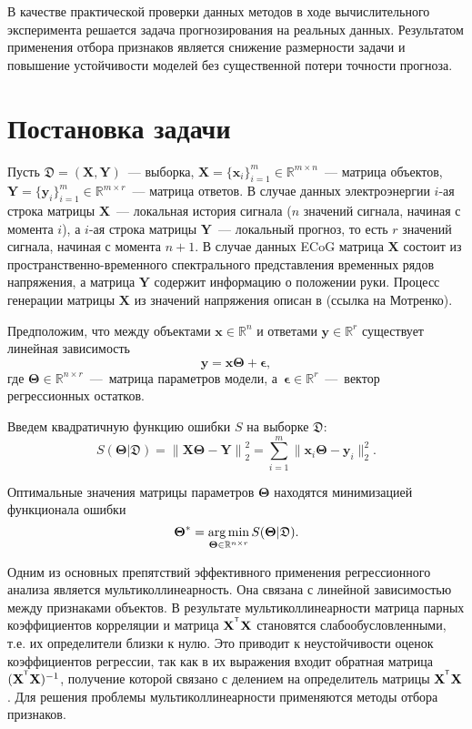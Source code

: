 \documentclass[12pt,twoside]{article}
\newcommand{\bx}{\mathbf{x}}
\newcommand{\by}{\mathbf{y}}
\newcommand{\bY}{\mathbf{Y}}
\newcommand{\bX}{\mathbf{X}}
\newcommand{\bTheta}{\boldsymbol{\Theta}}
\begin{document}
В качестве практической проверки данных методов в ходе вычислительного эксперимента решается задача прогнозирования на реальных данных.
Результатом применения отбора признаков является снижение размерности задачи и повышение устойчивости моделей без существенной потери точности прогноза.
 

\section{Постановка задачи}

Пусть $\mathfrak{D}= \left( \bX, \bY \right)$~--- выборка, $\mathbf{X} = \{\bx_i\}_{i=1}^m\in \mathbb{R}^{m \times n}$~--- матрица объектов, $\mathbf{Y} = \{\by_i\}_{i=1}^m \in \mathbb{R}^{m \times r}$~--- матрица ответов. 
В случае данных электроэнергии $i$-ая строка  матрицы $\bX$~--– локальная история сигнала ($n$ значений сигнала, начиная с момента $i$), а $i$-ая строка матрицы $\bY$~--– локальный прогноз, то есть $r$ значений сигнала, начиная с момента $n+1$. В случае данных ECoG матрица $\bX$ состоит из пространственно-временного спектрального представления временных рядов напряжения, а матрица $\bY$ содержит информацию о положении руки. Процесс генерации матрицы $\bX$ из значений напряжения описан в (ссылка на Мотренко). 

Предположим, что между объектами $\bx \in \mathbb{R}^n$ и ответами $\by \in \mathbb{R}^r$ существует линейная зависимость 
$$\by = \bx \bTheta + \boldsymbol{\epsilon}, $$ 
где $\bTheta \in \mathbb{R}^{n \times r}$~---~матрица параметров модели, а~$\boldsymbol{\epsilon}\in \mathbb{R}^{r}$~---~вектор регрессионных остатков.

Введем квадратичную функцию ошибки $S$ на выборке $\mathfrak{D}$:
\[
	S(\bTheta | \mathfrak{D}) = {\bigl\| \mathbf{X}\bTheta - \mathbf{Y} \bigr\| }_2^2 = \sum_{i=1}^m \| \bx_i \bTheta - \by_i\|_2^2.
\]

Оптимальные значения матрицы параметров $\bTheta$ находятся минимизацией функционала ошибки 
\[
{\bTheta}^{*} = \argmin_{\bTheta \in \mathbb{R}^{n \times r}} S(\bTheta | \mathfrak{D}).
\]
 

Одним из основных препятствий эффективного применения регрессионного анализа является мультиколлинеарность. Она связана с линейной зависимостью между признаками объектов. В результате мультиколлинеарности матрица парных коэффициентов корреляции и матрица $\bX^{\T} \bX$ становятся слабообусловленными, т.е. их определители близки к нулю. Это приводит к неустойчивости оценок коэффициентов регрессии, так как в их выражения входит обратная матрица $(\bX^{\T}\bX)^{-1}$, получение которой связано с делением на определитель матрицы $\bX^{\T}\bX$. 
Для решения проблемы мультиколлинеарности применяются методы отбора признаков. 
\end{document}
